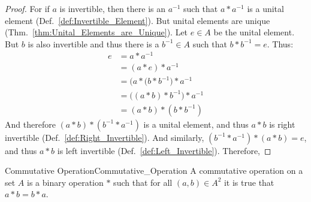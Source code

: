     \begin{proof}
        For if $a$ is invertible, then there is an $a^{\minus{1}}$ such that
        $a*a^{\minus{1}}$ is a unital element
        (Def.~\ref{def:Invertible_Element}). But unital elements are unique
        (Thm.~\ref{thm:Unital_Elements_are_Unique}). Let $e\in{A}$ be the unital
        element. But $b$ is also invertible and thus there is a
        $b^{\minus{1}}\in{A}$ such that $b*b^{\minus{1}}=e$. Thus:
        \begin{align}
            e&=a*a^{\minus{1}}
            \tag{Inverse Property}\\
            &=(a*e)*a^{\minus{1}}
            \tag{Identity}\\
            &=\big(a*(b*b^{\minus{1}}\big)*a^{\minus{1}}
            \tag{Inverse Property}\\
            &=\big((a*b)*b^{\minus{1}}\big)*a^{\minus{1}}
            \tag{Associativity}\\
            &=(a*b)*(b*b^{\minus{1}})
            \tag{Associativity}
        \end{align}
        And therefore $(a*b)*(b^{\minus{1}}*a^{\minus{1}})$ is a unital element,
        and thus $a*b$ is right invertible (Def.~\ref{def:Right_Invertible}).
        And similarly, $(b^{\minus{1}}*a^{\minus{1}})*(a*b)=e$, and thus
        $a*b$ is left invertible (Def.~\ref{def:Left_Invertible}). Therefore,
    \end{proof}
    \begin{fdefinition}{Commutative Operation}{Commutative_Operation}
        A \gls{commutative operation} on a \gls{set} $A$ is a
        \gls{binary operation} $*$ such that for all $(a,b)\in{A}^{2}$ it is
        true that $a*b=b*a$.
    \end{fdefinition}
